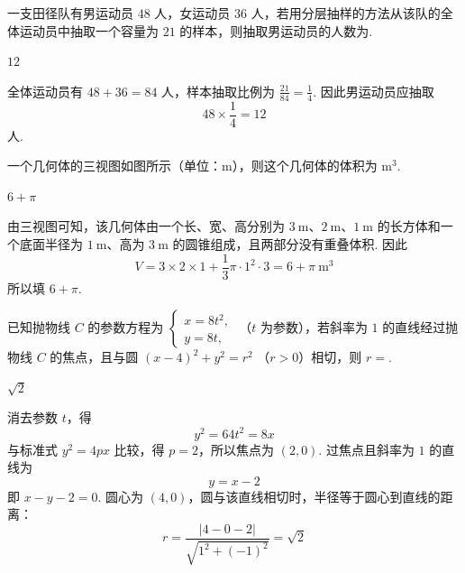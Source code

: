 \begin{problem}
一支田径队有男运动员 \(48\text{ 人}\)，女运动员 \(36\text{ 人}\)，若用分层抽样的方法从该队的全体运动员中抽取一个容量为 \(21\) 的样本，则抽取男运动员的人数为\fillinblank{}.
\begin{answer}
\(12\)
\end{answer}

\begin{solution}
全体运动员有 \(48+36=84\) 人，样本抽取比例为 \(\frac{21}{84}=\frac14\). 因此男运动员应抽取
\[
48\times\frac14=12
\]
人.
\end{solution}
\end{problem}

\begin{problem}
一个几何体的三视图如图所示（单位：m），则这个几何体的体积为\fillinblank{} \(\text{m}^{3}\).

\begin{answer}
\(6 + \pi\)
\end{answer}

\begin{solution}
由三视图可知，该几何体由一个长、宽、高分别为 \(3\mathrm{~m}\)、\(2\mathrm{~m}\)、\(1\mathrm{~m}\) 的长方体和一个底面半径为 \(1\mathrm{~m}\)、高为 \(3\mathrm{~m}\) 的圆锥组成，且两部分没有重叠体积. 因此
\[
V=3\times2\times1+\frac13\pi\cdot1^2\cdot3
=6+\pi\ \mathrm{m}^3
\]
所以填 \(6+\pi\).
\end{solution}
\end{problem}

\begin{problem}
已知抛物线 \(C\) 的参数方程为
\(\begin{cases}
x = 8t^{2},\\
y = 8t,
\end{cases}\)
（\(t\) 为参数），若斜率为 \(1\) 的直线经过抛物线 \(C\) 的焦点，且与圆 \( (x - 4)^{2} + y^{2} = r^{2} \) （\(r > 0\)）相切，则 \(r =\)\fillinblank{}.
\begin{answer}
\(\sqrt{2}\)
\end{answer}

\begin{solution}
消去参数 \(t\)，得
\[
y^2=64t^2=8x
\]
与标准式 \(y^2=4px\) 比较，得 \(p=2\)，所以焦点为 \((2,0)\). 过焦点且斜率为 \(1\) 的直线为
\[
y=x-2
\]
即 \(x-y-2=0\). 圆心为 \((4,0)\)，圆与该直线相切时，半径等于圆心到直线的距离：
\[
r=\frac{|4-0-2|}{\sqrt{1^2+(-1)^2}}=\sqrt2
\]
\end{solution}
\end{problem}

